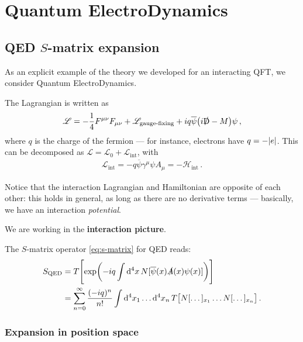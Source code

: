 \documentclass[main.tex]{subfiles}
\begin{document}
\chapter{Quantum ElectroDynamics}

\section{QED \(S\)-matrix expansion}


As an explicit example of the theory we developed for an interacting QFT, we consider Quantum ElectroDynamics.

The Lagrangian is written as 
%
\begin{align}
\mathscr{L} = 
- \frac{1}{4} F^{\mu \nu } F_{\mu \nu }
+ \mathscr{L} _{\text{gauge-fixing}}
+ i q \overline{\psi} \qty(i\slashed{\mathrm{D}} - M) \psi  
\,,
\end{align}
%
where \(q\) is the charge of the fermion --- for instance, electrons have \(q = - \abs{e}\). 
This can be decomposed as \(\mathscr{L} = \mathscr{L}_{0} + \mathscr{L} _{\text{int}}\), with 
%
\begin{align}
\mathscr{L} _{\text{int}} = - q \overline{\psi} \gamma^{\mu } \psi A_{\mu } = - \mathscr{H} _{\text{int}}
\,.
\end{align}

Notice that the interaction Lagrangian and Hamiltonian are opposite of each other: this holds in general, as long as there are no derivative terms --- basically, we have an interaction \emph{potential}. 

We are working in the \textbf{interaction picture}. 

The \(S\)-matrix operator \eqref{eq:s-matrix} for QED reads: 
%
\begin{align}
S _{\text{QED}}
&= T \qty[\exp(-iq \int \dd[4]{x} N [\overline{\psi}(x) \slashed{A} (x) \psi (x)])]  \\
&= \sum _{n=0}^{ \infty }
\frac{(-iq)^{n}}{n!}
\int \dd[4]{x_1 } \dots \dd[4]{x_{n}}
T \qty[N[\dots]_{x_1} \dots N[\dots]_{x_n}]
\,.
\end{align}

\subsection{Expansion in position space}
\end{document}
